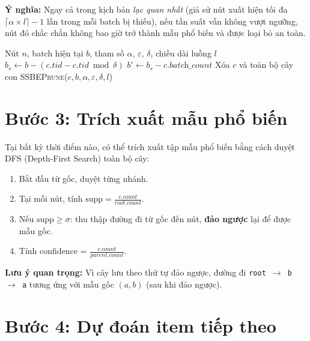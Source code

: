 \documentclass[a4paper,12pt]{report}
\begin{document}
\textbf{Ý nghĩa:} Ngay cả trong kịch bản \textit{lạc quan nhất} (giả sử nút xuất hiện tối đa $\lceil \alpha \times l \rceil - 1$ lần trong mỗi batch bị thiếu), nếu tần suất vẫn không vượt ngưỡng, nút đó chắc chắn không bao giờ trở thành mẫu phổ biến và được loại bỏ an toàn.

\begin{algorithm}[H]
\caption{Cắt tỉa SSBE}
\label{alg:ssbe}
\begin{algorithmic}[1]
\REQUIRE Nút $n$, batch hiện tại $b$, tham số $\alpha$, $\varepsilon$, $\delta$, chiều dài luồng $l$
    \STATE $b_s \leftarrow b - (c.\textit{tid} - c.\textit{tid} \bmod \delta)$ 
    \STATE $b' \leftarrow b_s - c.\textit{batch\_count}$ 
        \STATE Xóa $c$ và toàn bộ cây con 
    \ELSE
        \STATE \textsc{SSBEPrune}($c, b, \alpha, \varepsilon, \delta, l$) 
    \ENDIF
\ENDFOR
\end{algorithmic}
\end{algorithm}

\section{Bước 3: Trích xuất mẫu phổ biến}

Tại bất kỳ thời điểm nào, có thể trích xuất tập mẫu phổ biến bằng cách duyệt DFS (Depth-First Search) toàn bộ cây:

\begin{enumerate}
    \item Bắt đầu từ gốc, duyệt từng nhánh.
    \item Tại mỗi nút, tính $\text{supp} = \frac{c.\textit{count}}{\textit{root}.\textit{count}}$.
    \item Nếu $\text{supp} \geq \sigma$: thu thập đường đi từ gốc đến nút, \textbf{đảo ngược} lại để được mẫu gốc.
    \item Tính confidence = $\frac{c.\textit{count}}{\textit{parent}.\textit{count}}$.
\end{enumerate}

\textbf{Lưu ý quan trọng:} Vì cây lưu theo thứ tự đảo ngược, đường đi \texttt{root $\rightarrow$ b $\rightarrow$ a} tương ứng với mẫu gốc $(a, b)$ (sau khi đảo ngược).

\section{Bước 4: Dự đoán item tiếp theo}
\end{document}
